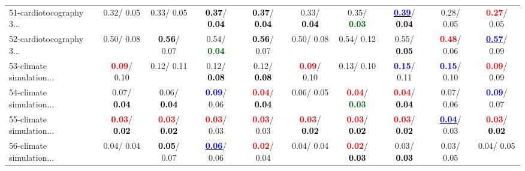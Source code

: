 \begin{table}[h]
\begin{center}
{\begin{tabular}{lc|c|c|c|c|c|c|c|c}
51-cardiotocography 3... &   0.32/  0.05 &   0.33/  0.05 & \textcolor{black}{\textbf{  0.37}}/\textcolor{black}{\textbf{  0.04}} & \textcolor{black}{\textbf{  0.37}}/\textcolor{black}{\textbf{  0.04}} &   0.33/\textcolor{black}{\textbf{  0.04}} &   0.35/\textcolor{darkgreen}{\textbf{  0.03}} & \underline{\textcolor{blue}{\textbf{  0.39}}}/\textcolor{black}{\textbf{  0.04}} &   0.28/  0.05 & \textcolor{red}{\textbf{  0.27}}/  0.05 \\
52-cardiotocography 3... &   0.50/  0.08 & \textcolor{black}{\textbf{  0.56}}/  0.07 &   0.54/\textcolor{darkgreen}{\textbf{  0.04}} & \textcolor{black}{\textbf{  0.56}}/  0.07 &   0.50/  0.08 &   0.54/  0.12 &   0.55/\textcolor{black}{\textbf{  0.05}} & \textcolor{red}{\textbf{  0.48}}/  0.06 & \underline{\textcolor{blue}{\textbf{  0.57}}}/  0.09 \\
53-climate simulation... & \textcolor{red}{\textbf{  0.09}}/  0.10 &   0.12/  0.11 &   0.12/\textcolor{black}{\textbf{  0.08}} &   0.12/\textcolor{black}{\textbf{  0.08}} & \textcolor{red}{\textbf{  0.09}}/  0.10 &   0.13/  0.10 & \textcolor{blue}{\textbf{  0.15}}/  0.11 & \textcolor{blue}{\textbf{  0.15}}/  0.10 & \textcolor{red}{\textbf{  0.09}}/  0.09 \\ \hline
54-climate simulation... &   0.07/\textcolor{black}{\textbf{  0.04}} &   0.06/\textcolor{black}{\textbf{  0.04}} & \textcolor{blue}{\textbf{  0.09}}/  0.06 & \textcolor{red}{\textbf{  0.04}}/\textcolor{black}{\textbf{  0.04}} &   0.06/  0.05 & \textcolor{red}{\textbf{  0.04}}/\textcolor{darkgreen}{\textbf{  0.03}} & \textcolor{red}{\textbf{  0.04}}/\textcolor{black}{\textbf{  0.04}} &   0.07/  0.06 & \textcolor{blue}{\textbf{  0.09}}/  0.07 \\
55-climate simulation... & \textcolor{red}{\textbf{  0.03}}/\textcolor{black}{\textbf{  0.02}} & \textcolor{red}{\textbf{  0.03}}/\textcolor{black}{\textbf{  0.02}} & \textcolor{red}{\textbf{  0.03}}/  0.03 & \textcolor{red}{\textbf{  0.03}}/  0.03 & \textcolor{red}{\textbf{  0.03}}/\textcolor{black}{\textbf{  0.02}} & \textcolor{red}{\textbf{  0.03}}/\textcolor{black}{\textbf{  0.02}} & \textcolor{red}{\textbf{  0.03}}/\textcolor{black}{\textbf{  0.02}} & \underline{\textcolor{blue}{\textbf{  0.04}}}/  0.03 & \textcolor{red}{\textbf{  0.03}}/\textcolor{black}{\textbf{  0.02}} \\
56-climate simulation... &   0.04/  0.04 & \textcolor{black}{\textbf{  0.05}}/  0.07 & \underline{\textcolor{blue}{\textbf{  0.06}}}/  0.06 & \textcolor{red}{\textbf{  0.02}}/  0.04 &   0.04/  0.04 & \textcolor{red}{\textbf{  0.02}}/\textcolor{black}{\textbf{  0.03}} &   0.03/\textcolor{black}{\textbf{  0.03}} &   0.03/  0.05 &   0.04/  0.05 \\

\end{tabular}}
\end{center}
\end{table}
